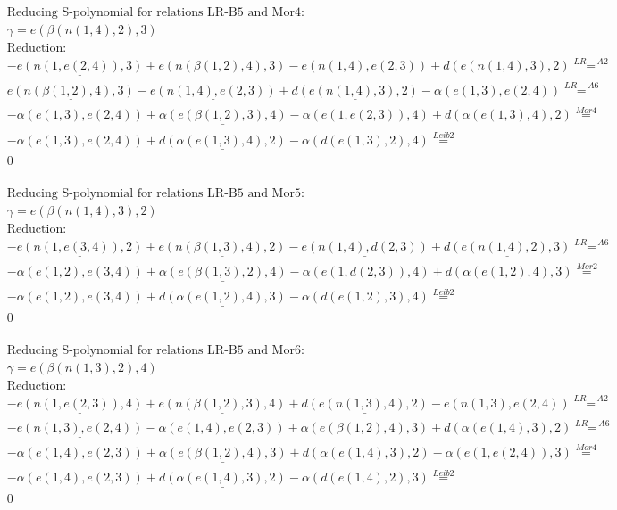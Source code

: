 \documentclass[11pt]{amsart}
\begin{document}
\begin{align*} 
& \text{Reducing S-polynomial for relations LR-B5 and Mor4:} \\ 
& \gamma = e(\beta(n(1,4),2),3) \\ 
& \text{Reduction}: \\& - \underline{e(n(1,e(2,4)),3)} + e(n(\beta(1,2),4),3) - e(n(1,4),e(2,3)) + d(e(n(1,4),3),2) \stackrel{ LR-A2 }{=}  \\ 
&\underline{e(n(\beta(1,2),4),3)} - \underline{e(n(1,4),e(2,3))} + \underline{d(e(n(1,4),3),2)} - \alpha(e(1,3),e(2,4)) \stackrel{ LR-A6 }{=}  \\ 
& - \alpha(e(1,3),e(2,4)) + \underline{\alpha(e(\beta(1,2),3),4)} - \alpha(e(1,e(2,3)),4) + d(\alpha(e(1,3),4),2) \stackrel{ Mor4 }{=}  \\ 
& - \alpha(e(1,3),e(2,4)) + \underline{d(\alpha(e(1,3),4),2)} - \alpha(d(e(1,3),2),4) \stackrel{ Leib2 }{=}  \\ 
&0\\ 
\end{align*} 
 
\begin{align*} 
& \text{Reducing S-polynomial for relations LR-B5 and Mor5:} \\ 
& \gamma = e(\beta(n(1,4),3),2) \\ 
& \text{Reduction}: \\& - \underline{e(n(1,e(3,4)),2)} + \underline{e(n(\beta(1,3),4),2)} - \underline{e(n(1,4),d(2,3))} + \underline{d(e(n(1,4),2),3)} \stackrel{ LR-A6 }{=}  \\ 
& - \alpha(e(1,2),e(3,4)) + \underline{\alpha(e(\beta(1,3),2),4)} - \alpha(e(1,d(2,3)),4) + d(\alpha(e(1,2),4),3) \stackrel{ Mor2 }{=}  \\ 
& - \alpha(e(1,2),e(3,4)) + \underline{d(\alpha(e(1,2),4),3)} - \alpha(d(e(1,2),3),4) \stackrel{ Leib2 }{=}  \\ 
&0\\ 
\end{align*} 
 
\begin{align*} 
& \text{Reducing S-polynomial for relations LR-B5 and Mor6:} \\ 
& \gamma = e(\beta(n(1,3),2),4) \\ 
& \text{Reduction}: \\& - \underline{e(n(1,e(2,3)),4)} + \underline{e(n(\beta(1,2),3),4)} + \underline{d(e(n(1,3),4),2)} - e(n(1,3),e(2,4)) \stackrel{ LR-A2 }{=}  \\ 
& - \underline{e(n(1,3),e(2,4))} - \alpha(e(1,4),e(2,3)) + \alpha(e(\beta(1,2),4),3) + d(\alpha(e(1,4),3),2) \stackrel{ LR-A6 }{=}  \\ 
& - \alpha(e(1,4),e(2,3)) + \underline{\alpha(e(\beta(1,2),4),3)} + d(\alpha(e(1,4),3),2) - \alpha(e(1,e(2,4)),3) \stackrel{ Mor4 }{=}  \\ 
& - \alpha(e(1,4),e(2,3)) + \underline{d(\alpha(e(1,4),3),2)} - \alpha(d(e(1,4),2),3) \stackrel{ Leib2 }{=}  \\ 
&0\\ 
\end{align*} 
 
\end{document}
